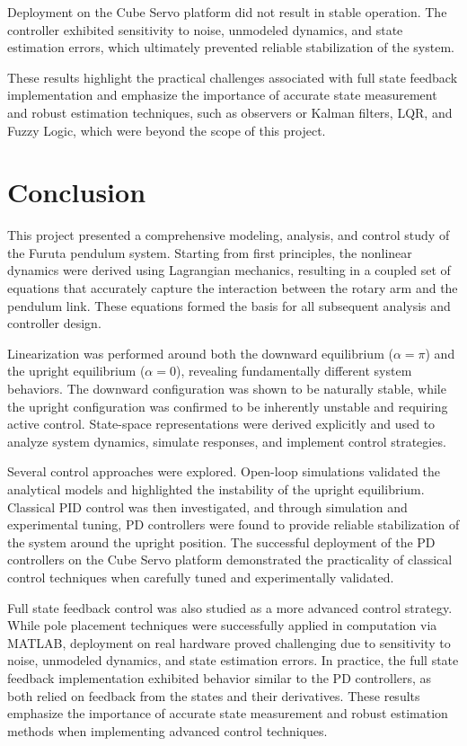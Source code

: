 \documentclass[12pt,a4paper]{article}
\begin{document}
Deployment on the Cube Servo platform did not result in stable operation. The controller exhibited sensitivity to noise, unmodeled dynamics, and state estimation errors, which ultimately prevented reliable stabilization of the system.

These results highlight the practical challenges associated with full state feedback implementation and emphasize the importance of accurate state measurement and robust estimation techniques, such as observers or Kalman filters, LQR, and Fuzzy Logic, which were beyond the scope of this project.


\section{Conclusion}

This project presented a comprehensive modeling, analysis, and control study of the Furuta pendulum system. Starting from first principles, the nonlinear dynamics were derived using Lagrangian mechanics, resulting in a coupled set of equations that accurately capture the interaction between the rotary arm and the pendulum link. These equations formed the basis for all subsequent analysis and controller design.

Linearization was performed around both the downward equilibrium ($\alpha=\pi$) and the upright equilibrium ($\alpha=0$), revealing fundamentally different system behaviors. The downward configuration was shown to be naturally stable, while the upright configuration was confirmed to be inherently unstable and requiring active control. State-space representations were derived explicitly and used to analyze system dynamics, simulate responses, and implement control strategies.

Several control approaches were explored. Open-loop simulations validated the analytical models and highlighted the instability of the upright equilibrium. Classical PID control was then investigated, and through simulation and experimental tuning, PD controllers were found to provide reliable stabilization of the system around the upright position. The successful deployment of the PD controllers on the Cube Servo platform demonstrated the practicality of classical control techniques when carefully tuned and experimentally validated.

Full state feedback control was also studied as a more advanced control strategy. While pole placement techniques were successfully applied in computation via MATLAB, deployment on real hardware proved challenging due to sensitivity to noise, unmodeled dynamics, and state estimation errors. In practice, the full state feedback implementation exhibited behavior similar to the PD controllers, as both relied on feedback from the states and their derivatives. These results emphasize the importance of accurate state measurement and robust estimation methods when implementing advanced control techniques.
\end{document}
